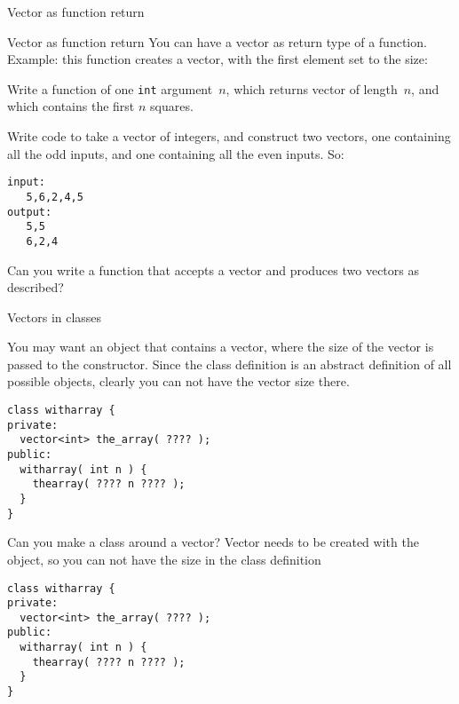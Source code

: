  {Vector as function return}

\begin{block}{Vector as function return}
  \label{sl:vector-return}
  You can have a vector as return type of a function.\\
  Example: this function
  creates a vector, with the first element set to the size:
\end{block}

\begin{exercise}
  \label{ex:vec-of-squares}
  Write a function of one \lstinline{int} argument~$n$, which returns vector
  of length~$n$, and which contains the first $n$ squares.
\end{exercise}

\begin{exercise}
  \label{ex:splitoddeven}
  Write code to take a vector of integers, and construct two
  vectors, one containing all the odd inputs, and one containing all
  the even inputs. So:
\begin{lstlisting}
input:
   5,6,2,4,5
output:
   5,5
   6,2,4
\end{lstlisting}
  Can you write a function that accepts a vector and produces two
  vectors as described?
\end{exercise}

 {Vectors in classes}

You may want an object that contains a vector, where the size of the
vector is passed to the constructor. Since the class definition is an
abstract definition of all possible objects, clearly you can not have the
vector size there.

\begin{lstlisting}
class witharray {
private:
  vector<int> the_array( ???? );
public:
  witharray( int n ) {
    thearray( ???? n ???? );
  }
}
\end{lstlisting}

\begin{slide}{Can you make a class around a vector?}
  \label{sl:class-with-vector}
  Vector needs to be created with the object, so you can not have the
  size in the class definition
\begin{lstlisting}
class witharray {
private:
  vector<int> the_array( ???? );
public:
  witharray( int n ) {
    thearray( ???? n ???? );
  }
}
\end{lstlisting}
\end{slide}

